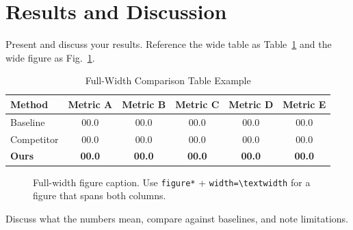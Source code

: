 \section{Results and Discussion}
\label{sec:results}

Present and discuss your results. Reference the wide table as
Table~\ref{tab:wide} and the wide figure as Fig.~\ref{fig:wide}.

\begin{table}[!tb]
\caption{Full-Width Comparison Table Example}
\label{tab:wide}
\setlength{\tabcolsep}{4pt}
\begin{tabular*}{\textwidth}{@{\extracolsep{\fill}}lccccc@{}}
\hline
\textbf{Method} & \textbf{Metric A} & \textbf{Metric B} & \textbf{Metric C}
& \textbf{Metric D} & \textbf{Metric E} \\
\hline
Baseline         & 00.0 & 00.0 & 00.0 & 00.0 & 00.0 \\
Competitor       & 00.0 & 00.0 & 00.0 & 00.0 & 00.0 \\
\textbf{Ours}    & \textbf{00.0} & \textbf{00.0} & \textbf{00.0}
                 & \textbf{00.0} & \textbf{00.0} \\
\hline
\end{tabular*}
\end{table}

\begin{figure}[!t]
\centering
\caption{Full-width figure caption. Use \texttt{figure*} +
\texttt{width=\textbackslash textwidth} for a figure that spans both columns.}
\label{fig:wide}
\end{figure}

Discuss what the numbers mean, compare against baselines, and note
limitations.
